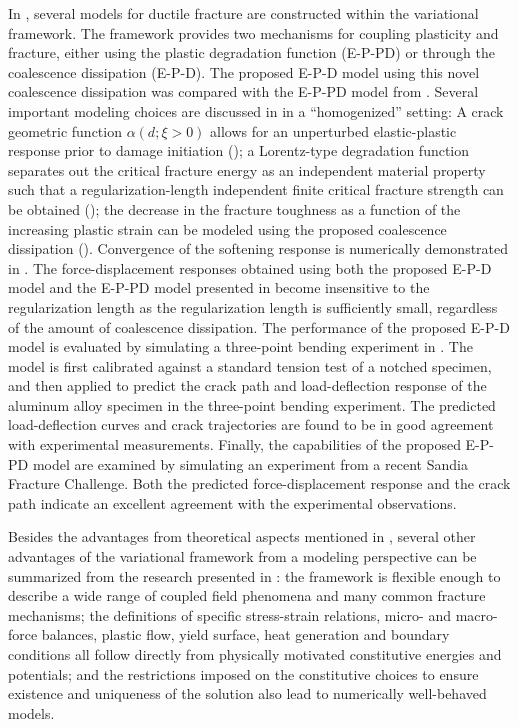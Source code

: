 In , several models for ductile fracture are constructed within the variational framework. The framework provides two mechanisms for coupling  plasticity and fracture, either using the plastic degradation function (E-P-PD) or through the coalescence dissipation (E-P-D). The proposed E-P-D model using this novel coalescence dissipation was compared with the E-P-PD model from \cite{brandon2020cohesive}.
Several important modeling choices are discussed in  in a ``homogenized'' setting:
A crack geometric function $\alpha(d; \xi > 0)$ allows for an unperturbed elastic-plastic response prior to damage initiation ();
a Lorentz-type degradation function separates out the critical fracture energy as an independent material property such that a regularization-length independent finite critical fracture strength can be obtained ();
the decrease in the fracture toughness as a function of the increasing plastic strain can be modeled using the proposed coalescence dissipation ().
Convergence of the softening response is numerically demonstrated in .
The force-displacement responses obtained using both the proposed E-P-D model and the E-P-PD model presented in \cite{brandon2020cohesive} become insensitive to the regularization length as the regularization length is sufficiently small, regardless of the amount of coalescence dissipation.
The performance of the proposed E-P-D model is evaluated by simulating a three-point bending experiment in . The model is first calibrated against a standard tension test of a notched specimen, and then applied to predict the crack path and load-deflection response of the aluminum alloy specimen in the three-point bending experiment.
The predicted load-deflection curves and crack trajectories are found to be in good agreement with experimental measurements. Finally, the capabilities of the proposed E-P-PD model are examined by simulating an experiment from a recent Sandia Fracture Challenge. Both the predicted force-displacement response and the crack path indicate an excellent agreement with the experimental observations.


Besides the advantages from theoretical aspects mentioned in , several other advantages of the variational framework from a modeling perspective can be summarized from the research presented in :
the framework is flexible enough to describe a wide range of coupled field phenomena and many common fracture mechanisms; the definitions of specific stress-strain relations, micro- and macro-force balances, plastic flow, yield surface, heat generation and boundary conditions all follow directly from physically motivated constitutive energies and potentials; and the restrictions imposed on the constitutive choices to ensure existence and uniqueness of the solution also lead to numerically well-behaved models.

